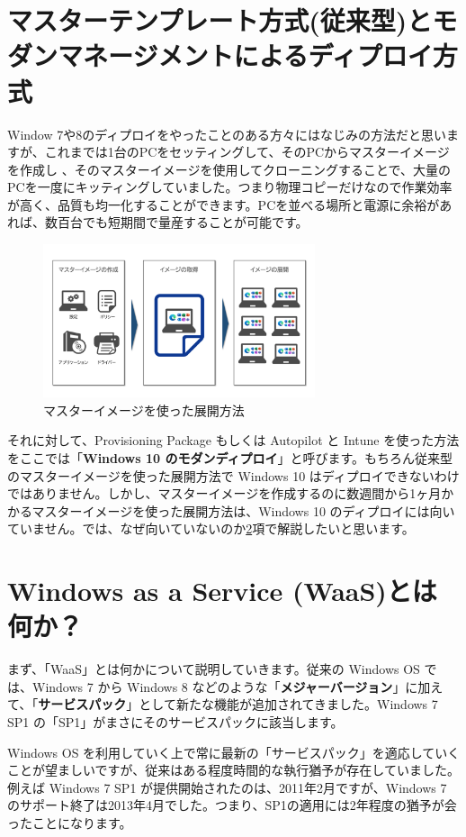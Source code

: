 \section{マスターテンプレート方式(従来型)とモダンマネージメントによるディプロイ方式}

Window 7や8のディプロイをやったことのある方々にはなじみの方法だと思いますが、これまでは1台のPCをセッティングして、そのPCからマスターイメージを作成し
、そのマスターイメージを使用してクローニングすることで、大量のPCを一度にキッティングしていました。つまり物理コピーだけなので作業効率が高く、品質も均一化することができます。PCを並べる場所と電源に余裕があれば、数百台でも短期間で量産することが可能です。


\begin{figure}[htbp]
    \centering
    \includegraphics[width=8cm]{figures/MasterImage.png}
    \caption{マスターイメージを使った展開方法}
    \label{fig:MasterImage}
\end{figure}

それに対して、Provisioning Package もしくは Autopilot と Intune を使った方法をここでは「\textbf{Windows 10 のモダンディプロイ}」と呼びます。もちろん従来型のマスターイメージを使った展開方法で Windows 10 はディプロイできないわけではありません。しかし、マスターイメージを作成するのに数週間から1ヶ月かかるマスターイメージを使った展開方法は、Windows 10 のディプロイには向いていません。では、なぜ向いていないのか\ref{sec:WaaS}項で解説したいと思います。

\section{Windows as a Service (WaaS)とは何か？}
\label{sec:WaaS}

まず、「WaaS」とは何かについて説明していきます。従来の Windows OS では、Windows 7 から Windows 8 などのような「\textbf{メジャーバージョン}」に加えて、「\textbf{サービスパック}」として新たな機能が追加されてきました。Windows 7 SP1 の「SP1」がまさにそのサービスパックに該当します。

Windows OS を利用していく上で常に最新の「サービスパック」を適応していくことが望ましいですが、従来はある程度時間的な執行猶予が存在していました。例えば Windows 7 SP1 が提供開始されたのは、2011年2月ですが、Windows 7 のサポート終了は2013年4月でした。つまり、SP1の適用には2年程度の猶予が会ったことになります。

